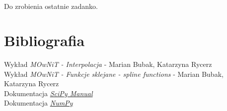 \documentclass{article}
\begin{document}
\subsection{}
Do zrobienia ostatnie zadanko.

\section{Bibliografia}
Wykład \textit{MOwNiT - Interpolacja} - Marian Bubak, Katarzyna Rycerz\\
Wykład \textit{MOwNiT - Funkcje sklejane - spline functions} - Marian Bubak, Katarzyna Rycerz\\
Dokumentacja \href{https://docs.scipy.org/doc/scipy/reference/generated/scipy.interpolate.krogh_interpolate.html#scipy.interpolate.krogh_interpolate}{\textit{SciPy Manual}}\\
Dokumentacja \href{https://numpy.org/doc/stable/reference/generated/numpy.polynomial.polynomial.Polynomial.html#numpy.polynomial.polynomial.Polynomial}{\textit{NumPy}}
\end{document}
